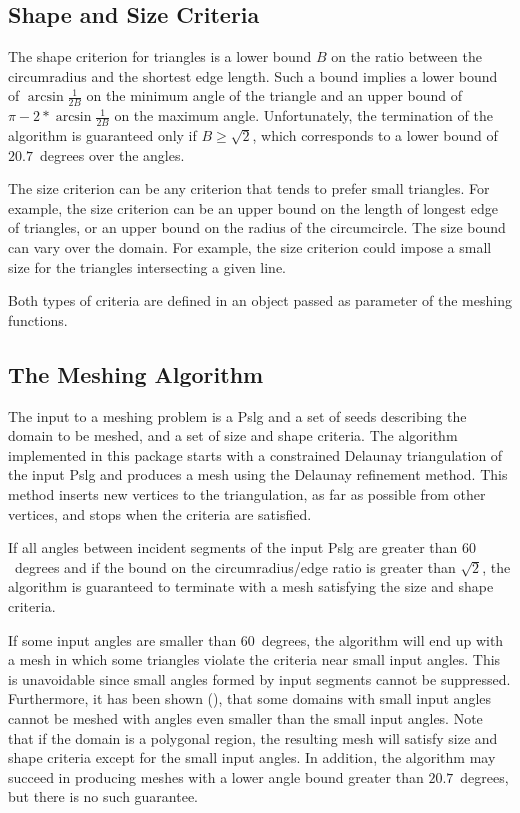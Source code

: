 \subsection{Shape and Size Criteria\label{sec:Mesh_2_criteria}}

The shape criterion for triangles is a lower bound $B$ on the ratio
between the circumradius and the shortest edge length.  Such a bound
implies a lower bound of $\arcsin{\frac{1}{2B}}$ on the minimum angle
of the triangle and an upper bound of $\pi - 2* \arcsin{\frac{1}{2B}}$
on the maximum angle.  Unfortunately, the termination of the algorithm
is guaranteed only if $B \ge \sqrt{2}$, which corresponds to a lower
bound of $20.7$~degrees over the angles.

The size criterion can be any criterion that tends to prefer small
triangles. For example, the size criterion can be an upper bound on the
length of longest edge of triangles, or an upper bound on the radius of the
circumcircle. The size bound can vary over the domain. For example,
the size criterion could impose a small size for the triangles intersecting
a given line.

Both types of criteria are defined in an object  passed as
parameter of the meshing functions.

\subsection{The Meshing Algorithm}

The input to a meshing problem is a {\sc Pslg} and a set of seeds
describing the domain to be meshed, and a set of size and shape
criteria.  The algorithm implemented in this package starts with a
constrained Delaunay triangulation of the input {\sc Pslg} and produces a
mesh using the Delaunay refinement method. This method inserts new vertices to
the triangulation, as far as possible from other vertices, and stops when the
criteria are satisfied.

If all angles between incident segments of the input {\sc Pslg}
are greater than $60$~degrees and if the bound on the
circumradius/edge ratio is greater than $\sqrt{2}$,
the algorithm is guaranteed to terminate with a mesh
satisfying the size and shape criteria.

If some input angles are smaller than $60$~degrees, the algorithm will
end up with a mesh in which some triangles violate the criteria near small
input angles. This is unavoidable since small angles formed
by input segments cannot be suppressed. Furthermore, it has been
shown (\cite{s-mgdsa-00}), that some domains with small input angles
cannot be meshed with angles even smaller than the small input angles.
Note that if the domain is a polygonal region, the resulting mesh will
satisfy size and shape criteria except for the small input angles.
In addition, the algorithm may succeed in producing meshes with a lower
angle bound greater than $20.7$~degrees, but there is no such guarantee.

